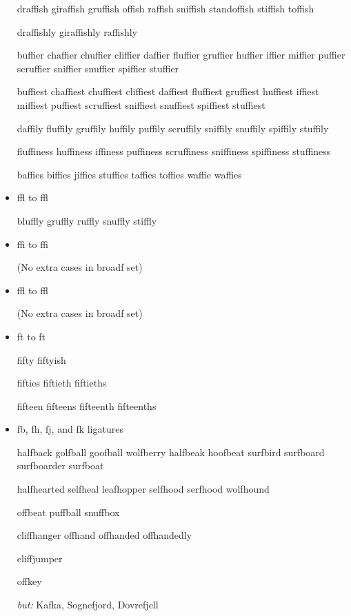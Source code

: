 \begin{itemize}
draffish giraffish gruffish offish raffish sniffish standoffish stiffish toffish

draffishly giraffishly raffishly

buffier chaffier chuffier cliffier daffier fluffier gruffier huffier iffier miffier puffier scruffier sniffier snuffier spiffier stuffier

buffiest chaffiest chuffiest cliffiest daffiest fluffiest gruffiest huffiest iffiest miffiest puffiest scruffiest sniffiest snuffiest spiffiest stuffiest

daffily fluffily gruffily huffily puffily scruffily sniffily snuffily spiffily stuffily

fluffiness huffiness iffiness puffiness scruffiness sniffiness spiffiness stuffiness

baffies biffies jiffies stuffies taffies toffies waffie waffies


\item ffl to ff\hspace{0pt}l

bluffly gruffly ruffly snuffly stiffly


\item ffi to f\hspace{0pt}fi

(No extra cases in broadf set)


\item ffl to f\hspace{0pt}fl

(No extra cases in broadf set)


\item ft to f\hspace{0pt}t

fifty fiftyish

fifties fiftieth fiftieths

fifteen fifteens fifteenth fifteenths

\bgroup \ebg
\item fb, fh, fj, and fk ligatures

halfback golfball goofball wolfberry halfbeak hoofbeat surfbird surfboard surfboarder surfboat

halfhearted selfheal leafhopper selfhood serfhood wolfhound

offbeat puffball snuffbox

cliffhanger offhand offhanded offhandedly

cliffjumper

offkey

\emph{but:} Kafka, Sognefjord, Dovrefjell

\egroup



\end{itemize}


